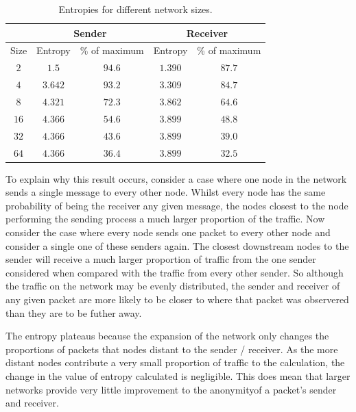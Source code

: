 \documentclass[ %
                    author={Luke Murray},
                supervisor={Dr. Simon Hollis},
                     title={Shadow Peer-to-Peer Networks},
                  subtitle={},
                    degree={MEng},
                      year={2013} ]{thesis}
\begin{document}

\begin{table}[t]
\centering
\begin{tabular}{|c|cc|cc|}
\hline
 & \multicolumn{2}{|c|}{Sender} & \multicolumn{2}{|c|}{Receiver} \\
\hline
Size & Entropy & \% of maximum & Entropy & \% of maximum \\
\hline
$2$ & $1.5$ & $94.6$ & $1.390$ & $87.7$\\
$4$ & $3.642$ & $93.2$ & $3.309$ & $84.7$\\
$8$ & $4.321$ & $72.3$ & $3.862$ & $64.6$\\
$16$ & $4.366$ & $54.6$ & $3.899$ & $48.8$\\
$32$ & $4.366$ & $43.6$ & $3.899$ & $39.0$\\
$64$ & $4.366$ & $36.4$ & $3.899$ & $32.5$\\
\hline
\end{tabular}
\caption{Entropies for different network sizes.}
\label{entropy_table}
\end{table}

To explain why this result occurs, consider a case where one node in the network sends a single message to every other node. Whilst every node has the same probability of being the receiver any given message, the nodes closest to the node performing the sending process a much larger proportion of the traffic. Now consider the case where every node sends one packet to every other node and consider a single one of these senders again. The closest downstream nodes to the sender will receive a much larger proportion of traffic from the one sender considered when compared with the traffic from every other sender. So although the traffic on the network may be evenly distributed, the sender and receiver of any given packet are more likely to be closer to where that packet was observered than they are to be futher away.

The entropy plateaus because the expansion of the network only changes the proportions of packets that nodes distant to the sender / receiver. As the more distant nodes contribute a very small proportion of traffic to the calculation, the change in the value of entropy calculated is negligible. This does mean that larger networks provide very little improvement to the anonymityof a packet's sender and receiver.
\end{document}
